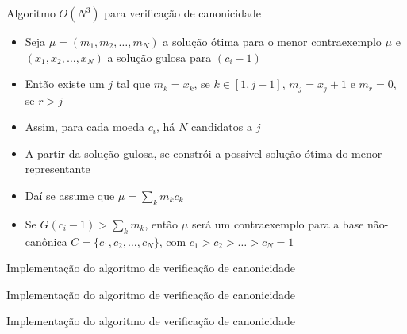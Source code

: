 \begin{frame}[fragile]{Algoritmo $O(N^3)$ para verificação de canonicidade}

    \begin{itemize}
        \item Seja $\mu = (m_1, m_2, \ldots, m_N)$ a solução ótima para o menor contraexemplo
            $\mu$ e $(x_1, x_2, \ldots, x_N)$ a solução gulosa para $(c_i - 1)$

        \item Então existe um $j$ tal que $m_k = x_k$, se $k\in [1, j -1]$, $m_j = x_j + 1$ e
                $m_r = 0$, se $r > j$

        \item Assim, para cada moeda $c_i$, há $N$ candidatos a $j$

        \item A partir da solução gulosa, se constrói a possível solução ótima do menor
            representante

        \item Daí se assume que $\mu = \sum_k m_kc_k$

        \item Se $G(c_i - 1) > \sum_k m_k$, então $\mu$ será um contraexemplo para a base
            não-canônica $C = \{ c_1, c_2, \ldots, c_N \}$, com $c_1 > c_2 > \ldots > c_N = 1$
    \end{itemize}

\end{frame}

\begin{frame}[fragile]{Implementação do algoritmo de verificação de canonicidade}
\end{frame}

\begin{frame}[fragile]{Implementação do algoritmo de verificação de canonicidade}
\end{frame}

\begin{frame}[fragile]{Implementação do algoritmo de verificação de canonicidade}
\end{frame}
